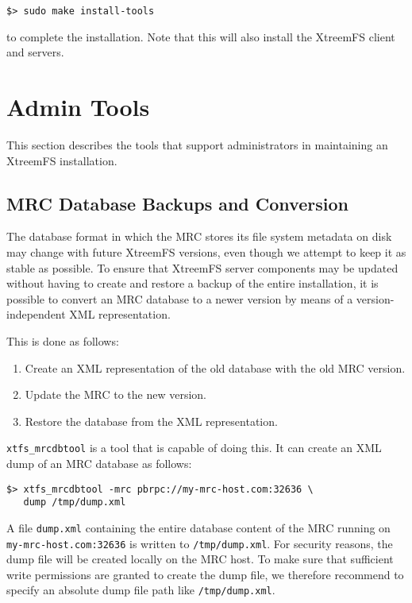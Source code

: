 \documentclass[a4paper,10pt]{book}
\begin{document}
\begin{verbatim}
$> sudo make install-tools
\end{verbatim}

to complete the installation. Note that this will also install the XtreemFS client and servers.

\section{Admin Tools}

This section describes the tools that support administrators in maintaining an XtreemFS installation.

\subsection{MRC Database Backups and Conversion}
\label{sec:mrcdbtools}

The database format in which the MRC stores its file system metadata on disk may change with future XtreemFS versions, even though we attempt to keep it as stable as possible. To ensure that XtreemFS server components may be updated without having to create and restore a backup of the entire installation, it is possible to convert an MRC database to a newer version by means of a version-independent XML representation.

This is done as follows:
\begin{enumerate}
  \item Create an XML representation of the old database with the old MRC version.
  \item Update the MRC to the new version.
  \item Restore the database from the XML representation.
\end{enumerate}

\texttt{xtfs\_mrcdbtool} is a tool that is capable of doing this. It can create an XML dump of an MRC database as follows:

\begin{verbatim}
$> xtfs_mrcdbtool -mrc pbrpc://my-mrc-host.com:32636 \
   dump /tmp/dump.xml
\end{verbatim}

A file \texttt{dump.xml} containing the entire database content of the MRC running on \texttt{my-mrc-host.com:32636} is written to \texttt{/tmp/dump.xml}. For security reasons, the dump file will be created locally on the MRC host. To make sure that sufficient write permissions are granted to create the dump file, we therefore recommend to specify an absolute dump file path like \texttt{/tmp/dump.xml}.
\end{document}
